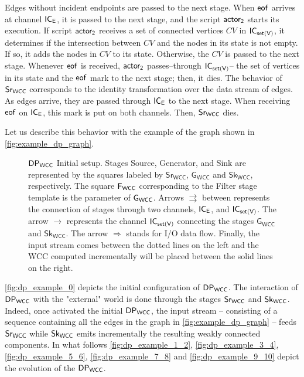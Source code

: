 Edges without incident endpoints are passed to the next stage. When $\mathsf{eof}$ arrives at channel $\mathsf{IC_E}$, it is passed to the next stage, and the script $\mathsf{actor_2}$ starts its execution. 
If script $\mathsf{actor_2}$ receives a set of connected vertices $CV$ in $\mathsf{IC_{set(V)}}$, it determines if the intersection between $CV$ and the nodes in its state is not empty. If so, it adds the nodes in $CV$  to its state. 
Otherwise, the $CV$ is passed to the next stage.  Whenever $\mathsf{eof}$ is received, $\mathsf{actor_2}$ passes--through $\mathsf{IC_{set(V)}}$-- the set of vertices in its state and the $\mathsf{eof}$ mark to the next stage; then, it dies.
The behavior of $\mathsf{Sr_{WCC}}$ corresponds to the identity transformation over the data stream of edges.  As edges arrive, they are passed through  $\mathsf{IC_E}$ to the next stage. When receiving $\mathsf{eof}$ on $\mathsf{IC_E}$, this mark is put on both channels. 
Then, $\mathsf{Sr_{WCC}}$ dies. 

Let us describe this behavior with the example of the graph shown in \autoref{fig:example_dp_graph}.

\begin{figure}[h!]
  \centering
{}
\caption[$\dpwcc$ Initial Setup]{$\dpwcc$ Initial setup. Stages Source, Generator, and Sink are represented by the squares labeled by $\mathsf{Sr_{WCC}}$, $\mathsf{G_{WCC}}$ and $\mathsf{Sk_{WCC}}$, respectively.  The square $\mathsf{F_{WCC}}$ corresponding to the Filter stage template is the parameter of $\mathsf{G_{WCC}}$. Arrows $\rightrightarrows$ between represents the connection of stages through two channels, $\mathsf{IC_E}$, and $\mathsf{IC_{set(V)}}$. The arrow  $\rightarrow$ represents the channel $\mathsf{IC_{set(V)}}$ connecting the stages $\mathsf{G_{WCC}}$ and $\mathsf{Sk_{WCC}}$. The arrow $\Longrightarrow$ stands for I/O data flow. Finally, the input stream comes between the dotted lines on the left and the WCC computed incrementally will be placed between the solid lines on the right.}
\label{fig:dp_example_0}
\end{figure}

\autoref{fig:dp_example_0} depicts the initial configuration of $\dpwcc$. 
The interaction of $\dpwcc$ with the "external" world is done through the stages $\mathsf{Sr_{WCC}}$ and $\mathsf{Sk_{WCC}}$. 
Indeed, once activated the initial $\dpwcc$, the input stream -- consisting of a sequence containing all the edges in the graph in \autoref{fig:example_dp_graph} -- feeds $\mathsf{Sr_{WCC}}$ while  $\mathsf{Sk_{WCC}}$ emits incrementally the resulting weakly connected components.  
In what follows \autoref{fig:dp_example_1_2}, \autoref{fig:dp_example_3_4}, \autoref{fig:dp_example_5_6}, \autoref{fig:dp_example_7_8} and \autoref{fig:dp_example_9_10} depict the evolution of the $\dpwcc$.
 
